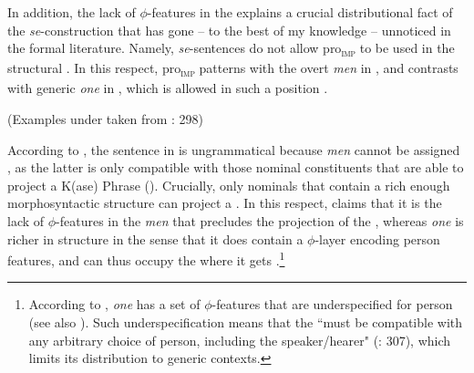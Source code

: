 \documentclass[output=paper,nonflat,newtxmath]{langsci/langscibook}
\begin{document}
 In addition, the lack of $\phi$-features in the  explains a crucial distributional fact of the   \textit{se}-construction that has gone -- to the best of my knowledge -- unnoticed in the formal literature. Namely,   \textit{se}-sentences do not allow pro\textsubscript{\textsc{imp}} to be used in the structural  . In this respect,  pro\textsubscript{\textsc{imp}} patterns with the overt   \textit{men} in  , and  contrasts with  generic \textit{one} in , which is allowed in such a position .

\begin{exe}
 \label{ex:lenardic: 23}
\ex \label{ex:lenardic: 24} \begin{xlist}
\hfill (Examples under   taken from \citealt{Fenger2017}: 298)
\end{xlist}
\end{exe}


 \noindent According to \citet{Fenger2017}, the  sentence in  is ungrammatical because  \textit{men} cannot be assigned , as the latter is  only compatible with those nominal constituents that are able to project a K(ase) Phrase (\citealt{bayer2001}). Crucially, only nominals that contain a rich enough morphosyntactic structure can project a . In this respect, \citet{Fenger2017} claims that it is the lack of $\phi$-features in the   \textit{men}  that precludes the projection of the , whereas  \textit{one} is richer in structure in the sense that it does contain a $\phi$-layer encoding person features, and can thus occupy the   where it gets .\footnote{According to \citet{Fenger2017},  \textit{one} has a set of $\phi$-features that are underspecified for person (see also \citealt{ackema2018}). Such underspecification means that the  ``must be compatible with any arbitrary choice of person, including the speaker/hearer" (\citealt{Fenger2017}: 307), which limits its distribution to generic contexts.}
\end{document}
